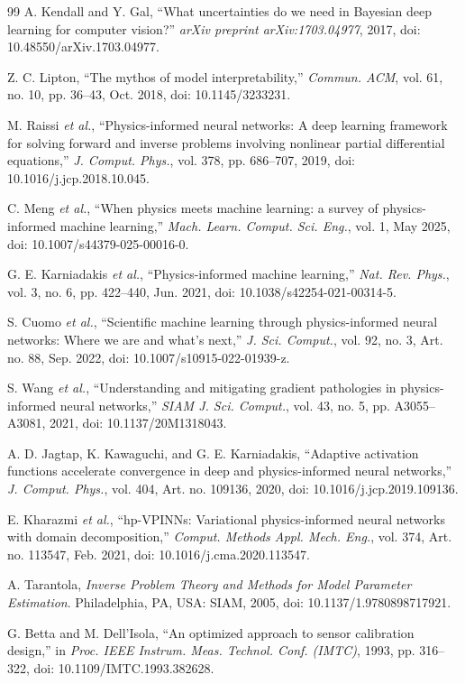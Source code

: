 \documentclass[journal,twoside,web]{ieeecolor}
\begin{document}
\begin{thebibliography}{99}
A. Kendall and Y. Gal, ``What uncertainties do we need in Bayesian deep learning for computer vision?'' \emph{arXiv preprint arXiv:1703.04977}, 2017, doi: 10.48550/arXiv.1703.04977.

Z. C. Lipton, ``The mythos of model interpretability,'' \emph{Commun. ACM}, vol. 61, no. 10, pp. 36--43, Oct. 2018, doi: 10.1145/3233231.

M. Raissi \emph{et al.}, ``Physics-informed neural networks: A deep learning framework for solving forward and inverse problems involving nonlinear partial differential equations,'' \emph{J. Comput. Phys.}, vol. 378, pp. 686--707, 2019, doi: 10.1016/j.jcp.2018.10.045.

C. Meng \emph{et al.}, ``When physics meets machine learning: a survey of physics-informed machine learning,'' \emph{Mach. Learn. Comput. Sci. Eng.}, vol. 1, May 2025, doi: 10.1007/s44379-025-00016-0.

G. E. Karniadakis \emph{et al.}, ``Physics-informed machine learning,'' \emph{Nat. Rev. Phys.}, vol. 3, no. 6, pp. 422--440, Jun. 2021, doi: 10.1038/s42254-021-00314-5.

S. Cuomo \emph{et al.}, ``Scientific machine learning through physics-informed neural networks: Where we are and what's next,'' \emph{J. Sci. Comput.}, vol. 92, no. 3, Art. no. 88, Sep. 2022, doi: 10.1007/s10915-022-01939-z.

S. Wang \emph{et al.}, ``Understanding and mitigating gradient pathologies in physics-informed neural networks,'' \emph{SIAM J. Sci. Comput.}, vol. 43, no. 5, pp. A3055--A3081, 2021, doi: 10.1137/20M1318043.

A. D. Jagtap, K. Kawaguchi, and G. E. Karniadakis, ``Adaptive activation functions accelerate convergence in deep and physics-informed neural networks,'' \emph{J. Comput. Phys.}, vol. 404, Art. no. 109136, 2020, doi: 10.1016/j.jcp.2019.109136.

E. Kharazmi \emph{et al.}, ``hp-VPINNs: Variational physics-informed neural networks with domain decomposition,'' \emph{Comput. Methods Appl. Mech. Eng.}, vol. 374, Art. no. 113547, Feb. 2021, doi: 10.1016/j.cma.2020.113547.

A. Tarantola, \emph{Inverse Problem Theory and Methods for Model Parameter Estimation}. Philadelphia, PA, USA: SIAM, 2005, doi: 10.1137/1.9780898717921.

G. Betta and M. Dell'Isola, ``An optimized approach to sensor calibration design,'' in \emph{Proc. IEEE Instrum. Meas. Technol. Conf. (IMTC)}, 1993, pp. 316--322, doi: 10.1109/IMTC.1993.382628.



\end{thebibliography}
\end{document}

